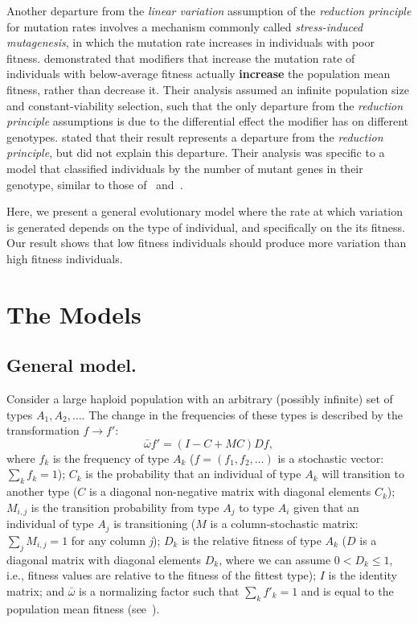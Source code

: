 \documentclass[9pt, a4paper, twocolumn]{extarticle}   	%
\begin{document}
Another departure from the \emph{linear variation} assumption of the \emph{reduction principle} for mutation rates involves a mechanism commonly called \emph{stress-induced mutagenesis}, in which the mutation rate increases in individuals with poor fitness.
\citet{Ram2012} demonstrated that modifiers that increase the mutation rate of individuals with below-average fitness actually \textbf{increase} the population mean fitness, rather than decrease it.
Their analysis assumed an infinite population size and constant-viability selection, such that the only departure from the \emph{reduction principle} assumptions is due to the differential effect the modifier has on different genotypes.
\citet{Ram2012} stated that their result represents a departure from the \emph{reduction principle}, but did not explain this departure.
Their analysis was specific to a model that classified individuals by the number of mutant genes in their genotype, similar to those of~\citet{Kimura1966} and~\citet{Haigh1978}. 

Here, we present a general evolutionary model where the rate at which variation is generated depends on the type of individual, and specifically on the its fitness.
Our result shows that low fitness individuals should produce more variation than high fitness individuals.

\section*{The Models}

\subsection*{General model.}
Consider a large haploid population with an arbitrary (possibly infinite) set of types $A_1, A_2, \ldots$.
The change in the frequencies of these types is described by the transformation $f \to f'$: 
\begin{equation}\label{eq:model}
\bar{\omega} f' = (I-C+MC)D f,
\end{equation}
where $f_k$ is the frequency of type $A_k$ ($f=(f_1, f_2, \ldots)$ is a stochastic vector: $\sum_k{f_k} = 1$);
$C_k$ is the probability that an individual of type $A_k$ will transition to another type ($C$ is a diagonal non-negative matrix with diagonal elements $C_k$);
$M_{i,j}$ is the transition probability from type $A_j$ to type $A_i$ given that an individual of type $A_j$ is transitioning ($M$ is a column-stochastic matrix: $\sum_j {M_{i,j}} = 1$ for any column \emph{j}); 
$D_k$ is the relative fitness of type $A_k$ ($D$ is a diagonal matrix with diagonal elements $D_k$, where we can assume $0 < D_k \le 1$, i.e., fitness values are relative to the fitness of the fittest type); 
$I$ is the identity matrix;
and $\bar{\omega}$ is a normalizing factor such that $\sum_k{f'_k}=1$ and is equal to the population mean fitness (see~).
\end{document}

